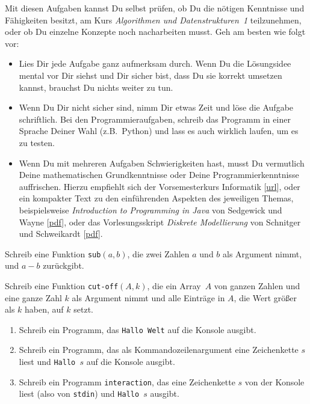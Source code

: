 \documentclass{uebung_cs}
\begin{document}
Mit diesen Aufgaben kannst Du selbst prüfen, ob Du die nötigen Kenntnisse und Fähigkeiten besitzt, am Kurs \emph{Algorithmen und Datenstrukturen~1} teilzunehmen, oder ob Du einzelne Konzepte noch nacharbeiten musst.
Geh am besten wie folgt vor:
\begin{itemize}
    \item Lies Dir jede Aufgabe ganz aufmerksam durch. Wenn Du die Lösungsidee mental vor Dir siehst und Dir sicher bist, dass Du sie korrekt umsetzen kannst, brauchst Du nichts weiter zu tun.
    \item Wenn Du Dir nicht sicher sind, nimm Dir etwas Zeit und löse die Aufgabe schriftlich. Bei den Programmieraufgaben, schreib das Programm in einer Sprache Deiner Wahl (z.B.~Python) und lass es auch wirklich laufen, um es zu testen.
    \item Wenn Du mit mehreren Aufgaben Schwierigkeiten hast, musst Du vermutlich Deine mathematischen Grundkenntnisse oder Deine Programmierkenntnisse auffrischen. Hierzu empfiehlt sich der Vorsemesterkurs Informatik [\href{http://www-stud.informatik.uni-frankfurt.de/~lz_inf/Vorkurs/WS2021/webseite.html}{url}], oder ein kompakter Text zu den einführenden Aspekten des jeweiligen Themas, beispielsweise \emph{Introduction to Programming in Java} von Sedgewick und Wayne [\href{https://introcs.cs.princeton.edu/java/home/chapter1.pdf}{pdf}], oder das Vorlesungsskript \emph{Diskrete Modellierung} von Schnitger und Schweikardt [\href{http://algo.cs.uni-frankfurt.de/lehre/dismod/material/skript1920.pdf}{pdf}].
\end{itemize}

\begin{aufgabe}[Subtraktion]
    Schreib eine Funktion \texttt{sub}$(a,b)$, die zwei Zahlen $a$ und $b$ als Argument nimmt, und $a-b$ zurückgibt.
\end{aufgabe}

\begin{aufgabe}
    Schreib eine Funktion \texttt{cut-off}$(A,k)$, die ein Array~$A$ von ganzen Zahlen und eine ganze Zahl $k$ als Argument nimmt und alle Einträge in $A$, die Wert größer als $k$ haben, auf $k$ setzt.
\end{aufgabe}

\begin{aufgabe}\mbox{}
    \begin{enumerate}
        \item Schreib ein Programm, das \texttt{Hallo Welt} auf die Konsole ausgibt.
        \item Schreib ein Programm, das als Kommandozeilenargument eine Zeichenkette $s$ liest und \texttt{Hallo $s$} auf die Konsole ausgibt.
        \item Schreib ein Programm \texttt{interaction}, das eine Zeichenkette $s$ von der Konsole liest (also von \texttt{stdin}) und \texttt{Hallo $s$} ausgibt.
    \end{enumerate}
\end{aufgabe}
\end{document}
